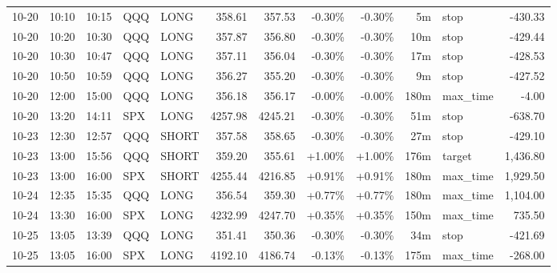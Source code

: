 \documentclass[11pt,a4paper,twoside]{article}
\begin{document}
\begin{center}
\begin{longtable}{>{\color{txtmain}}l l l l l r r r r r >{\color{txtmain}}l r}
10-20 & 10:10 & 10:15 & QQQ & LONG & 358.61 & 357.53 & \textcolor{lossred}{-0.30\%} & \textcolor{lossred}{-0.30\%} & 5m & stop & \textcolor{lossred}{-430.33} \\
10-20 & 10:20 & 10:30 & QQQ & LONG & 357.87 & 356.80 & \textcolor{lossred}{-0.30\%} & \textcolor{lossred}{-0.30\%} & 10m & stop & \textcolor{lossred}{-429.44} \\
10-20 & 10:30 & 10:47 & QQQ & LONG & 357.11 & 356.04 & \textcolor{lossred}{-0.30\%} & \textcolor{lossred}{-0.30\%} & 17m & stop & \textcolor{lossred}{-428.53} \\
10-20 & 10:50 & 10:59 & QQQ & LONG & 356.27 & 355.20 & \textcolor{lossred}{-0.30\%} & \textcolor{lossred}{-0.30\%} & 9m & stop & \textcolor{lossred}{-427.52} \\
10-20 & 12:00 & 15:00 & QQQ & LONG & 356.18 & 356.17 & \textcolor{lossred}{-0.00\%} & \textcolor{lossred}{-0.00\%} & 180m & max\_time & \textcolor{lossred}{-4.00} \\
10-20 & 13:20 & 14:11 & SPX & LONG & 4257.98 & 4245.21 & \textcolor{lossred}{-0.30\%} & \textcolor{lossred}{-0.30\%} & 51m & stop & \textcolor{lossred}{-638.70} \\
10-23 & 12:30 & 12:57 & QQQ & SHORT & 357.58 & 358.65 & \textcolor{lossred}{-0.30\%} & \textcolor{lossred}{-0.30\%} & 27m & stop & \textcolor{lossred}{-429.10} \\
10-23 & 13:00 & 15:56 & QQQ & SHORT & 359.20 & 355.61 & \textcolor{wingreen}{+1.00\%} & \textcolor{wingreen}{+1.00\%} & 176m & target & \textcolor{wingreen}{1,436.80} \\
10-23 & 13:00 & 16:00 & SPX & SHORT & 4255.44 & 4216.85 & \textcolor{wingreen}{+0.91\%} & \textcolor{wingreen}{+0.91\%} & 180m & max\_time & \textcolor{wingreen}{1,929.50} \\
10-24 & 12:35 & 15:35 & QQQ & LONG & 356.54 & 359.30 & \textcolor{wingreen}{+0.77\%} & \textcolor{wingreen}{+0.77\%} & 180m & max\_time & \textcolor{wingreen}{1,104.00} \\
10-24 & 13:30 & 16:00 & SPX & LONG & 4232.99 & 4247.70 & \textcolor{wingreen}{+0.35\%} & \textcolor{wingreen}{+0.35\%} & 150m & max\_time & \textcolor{wingreen}{735.50} \\
10-25 & 13:05 & 13:39 & QQQ & LONG & 351.41 & 350.36 & \textcolor{lossred}{-0.30\%} & \textcolor{lossred}{-0.30\%} & 34m & stop & \textcolor{lossred}{-421.69} \\
10-25 & 13:05 & 16:00 & SPX & LONG & 4192.10 & 4186.74 & \textcolor{lossred}{-0.13\%} & \textcolor{lossred}{-0.13\%} & 175m & max\_time & \textcolor{lossred}{-268.00} \\

\end{longtable}
\end{center}
\end{document}
